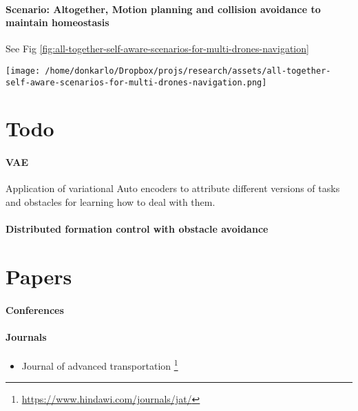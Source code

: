 \documentclass{article}
\begin{document}
			\paragraph{Scenario: Altogether, Motion planning and collision avoidance to maintain homeostasis}
				See Fig \ref{fig:all-together-self-aware-scenarios-for-multi-drones-navigation}
				\begin{figure*}
					\centering
					\texttt{[image: /home/donkarlo/Dropbox/projs/research/assets/all-together-self-aware-scenarios-for-multi-drones-navigation.png]}
					\caption{All the collision avoidance scenarios which help the system to avoid collision}
					\label{fig:all-together-self-aware-scenarios-for-multi-drones-navigation}
				\end{figure*}
	\section{Todo}
		\paragraph{VAE}Application of variational Auto encoders to attribute different versions of tasks and obstacles for learning how to deal with them.
		\paragraph{Distributed formation control with obstacle avoidance}
		
	\section{Papers}
		\paragraph{Conferences}
		\paragraph{Journals}
			\begin{itemize}
				\item Journal of advanced transportation \footnote{\url{https://www.hindawi.com/journals/jat/}} 
			\end{itemize}
	
\end{document}
